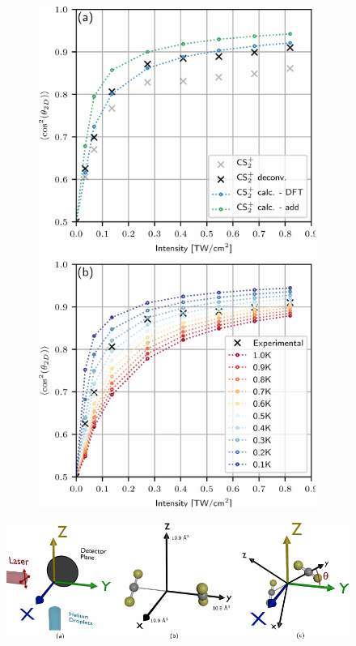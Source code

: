 \documentclass[10pt,a4paper]{memoir}
\begin{document}
\begin{figure}[h]
\begin{subfigure}[b]{0.35\textwidth}
		\includegraphics[width=\textwidth]{example_fig3.pdf}
	\end{subfigure}
\end{figure}
\begin{figure}[h]
	\centering
	\includegraphics[width=\textwidth]{example_fig2.pdf}
\end{figure}
\end{document}
